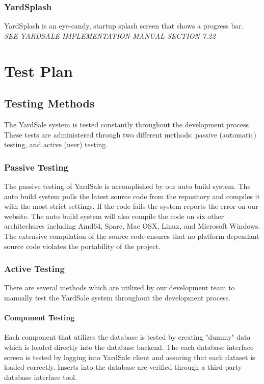 \documentclass{report}
\begin{document}
        \subsection{YardSplash}
        YardSplash is an eye-candy, startup splash screen that shows a
        progress bar.\\
        {\sl SEE YARDSALE IMPLEMENTATION MANUAL SECTION 7.22}

\chapter{Test Plan}

    \section {Testing Methods}


The YardSale system is tested constantly throughout the
development process.  These tests are administered through two
different methods: passive (automatic) testing, and active (user)
testing.

    \subsection{Passive Testing}

    The passive testing of YardSale is accomplished by our auto build system.  The auto build system pulls the latest source
    code from the repository and compiles it with the most strict settings.  If the code fails the system reports the error
    on our website.  The auto build system will also compile the code on six other architechures including Amd64, Sparc, Mac OSX,
    Linux, and Microsoft Windows.  The extensive compilation of the source code ensures that no platform dependant source code
    violates the portability of the project.

    \subsection{Active Testing}
    There are several methods which are utilized by our
    development team to manually test the YardSale system
    throughout the development process.
        \subsubsection{Component Testing}
	Each component that utilizes the database is tested by creating "dummy" data which is loaded directly into the database backend.  The each database interface screen is tested by logging into YardSale client and assuring that each dataset is loaded correctly.  Inserts into the database are verified through a third-party database interface tool.
\end{document}

